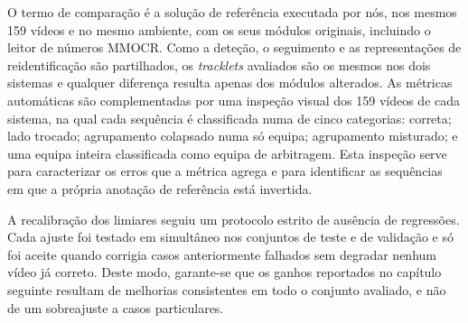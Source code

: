 O termo de comparação é a solução de referência executada por nós, nos mesmos 159 vídeos e no mesmo
ambiente, com os seus módulos originais, incluindo o leitor de números MMOCR. Como a deteção, o
seguimento e as representações de reidentificação são partilhados, os \emph{tracklets} avaliados são
os mesmos nos dois sistemas e qualquer diferença resulta apenas dos módulos alterados. As métricas
automáticas são complementadas por uma inspeção visual dos 159 vídeos de cada sistema, na qual cada
sequência é classificada numa de cinco categorias: correta; lado trocado; agrupamento colapsado numa
só equipa; agrupamento misturado; e uma equipa inteira classificada como equipa de arbitragem. Esta
inspeção serve para caracterizar os erros que a métrica agrega e para identificar as sequências em
que a própria anotação de referência está invertida.

A recalibração dos limiares seguiu um protocolo estrito de ausência de regressões. Cada ajuste foi
testado em simultâneo nos conjuntos de teste e de validação e só foi aceite quando corrigia casos
anteriormente falhados sem degradar nenhum vídeo já correto. Deste modo, garante-se que os ganhos
reportados no capítulo seguinte resultam de melhorias consistentes em todo o conjunto avaliado, e não
de um sobreajuste a casos particulares.